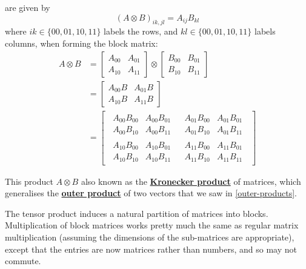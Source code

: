 \documentclass[fleqn]{article}
\newenvironment{technical}{\noindent}{\medskip}
\begin{document}
are given by
\[
  (A\otimes B)_{ik,jl} = A_{ij}B_{kl}
\]
where \(ik\in\{00,01,10,11\}\) labels the rows, and \(kl\in\{00,01,10,11\}\) labels columns, when forming the block matrix:
\[
  \begin{aligned}
    A\otimes B
    &= \begin{bmatrix}A_{00}&A_{01}\\A_{10}&A_{11}\end{bmatrix} \otimes \begin{bmatrix}B_{00}&B_{01}\\B_{10}&B_{11}\end{bmatrix}
  \\&= \begin{bmatrix}A_{00}B&A_{01}B\\A_{10}B&A_{11}B\end{bmatrix}
  \\&=
  \left[
  \,
    \begin{array}{c|c}
      \begin{matrix}A_{00}B_{00}&A_{00}B_{01}\\A_{00}B_{10}&A_{00}B_{11}\end{matrix}
      & \begin{matrix}A_{01}B_{00}&A_{01}B_{01}\\A_{01}B_{10}&A_{01}B_{11}\end{matrix}
    \\\hline
    \begin{matrix}A_{10}B_{00}&A_{10}B_{01}\\A_{10}B_{10}&A_{10}B_{11}\end{matrix}
      & \begin{matrix}A_{11}B_{00}&A_{11}B_{01}\\A_{11}B_{10}&A_{11}B_{11}\end{matrix}
    \end{array}
  \,
  \right]
  \end{aligned}
\]

\begin{technical}
This product \(A\otimes B\) also known as the \href{https://en.wikipedia.org/wiki/Kronecker_product}{\textbf{Kronecker product}} of matrices, which generalises the \href{https://en.wikipedia.org/wiki/Outer_product}{\textbf{outer product}} of two vectors that we saw in \ref{outer-products}.

\end{technical}

The tensor product induces a natural partition of matrices into blocks.
Multiplication of block matrices works pretty much the same as regular matrix multiplication (assuming the dimensions of the sub-matrices are appropriate), except that the entries are now matrices rather than numbers, and so may not commute.
\end{document}
